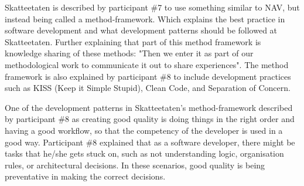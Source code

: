 
Skatteetaten is described by participant \#7 to use something similar to NAV, but instead being called a method-framework. Which explains the best practice in software development and what development patterns should be followed at Skatteetaten. Further explaining that part of this method framework is knowledge sharing of these methods: "Then we enter it as part of our methodological work to communicate it out to share experiences". The method framework is also explained by participant \#8 to include development practices such as KISS (Keep it Simple Stupid), Clean Code, and Separation of Concern.


One of the development patterns in Skatteetaten's method-framework described by participant \#8 as creating good quality is doing things in the right order and having a good workflow, so that the competency of the developer is used in a good way. Participant \#8 explained that as a software developer, there might be tasks that he/she gets stuck on, such as not understanding logic, organisation rules, or architectural decisions. In these scenarios, good quality is being preventative in making the correct decisions.


